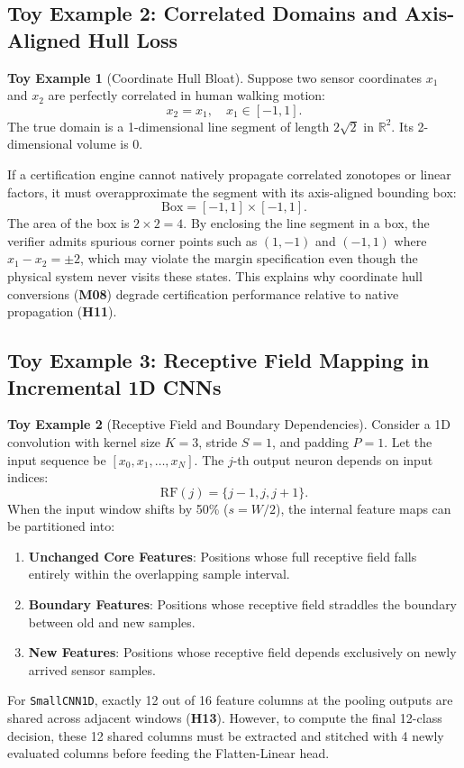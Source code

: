 \documentclass[11pt,article]{article}
\theoremstyle{definition}
\newtheorem{toyexample}{Toy Example}
\begin{document}
\subsection{Toy Example 2: Correlated Domains and Axis-Aligned Hull Loss}
\begin{toyexample}[Coordinate Hull Bloat]
Suppose two sensor coordinates $x_1$ and $x_2$ are perfectly correlated in human walking motion:
\begin{equation}
x_2 = x_1, \quad x_1 \in [-1, 1].
\end{equation}
The true domain is a 1-dimensional line segment of length $2\sqrt{2}$ in $\mathbb{R}^2$. Its 2-dimensional volume is 0.

If a certification engine cannot natively propagate correlated zonotopes or linear factors, it must overapproximate the segment with its axis-aligned bounding box:
\begin{equation}
\text{Box} = [-1, 1] \times [-1, 1].
\end{equation}
The area of the box is $2 \times 2 = 4$. By enclosing the line segment in a box, the verifier admits spurious corner points such as $(1, -1)$ and $(-1, 1)$ where $x_1 - x_2 = \pm 2$, which may violate the margin specification even though the physical system never visits these states. This explains why coordinate hull conversions (\textbf{M08}) degrade certification performance relative to native propagation (\textbf{H11}).
\end{toyexample}

\subsection{Toy Example 3: Receptive Field Mapping in Incremental 1D CNNs}
\begin{toyexample}[Receptive Field and Boundary Dependencies]
Consider a 1D convolution with kernel size $K=3$, stride $S=1$, and padding $P=1$.
Let the input sequence be $[x_0, x_1, \dots, x_N]$.
The $j$-th output neuron depends on input indices:
\begin{equation}
\text{RF}(j) = \{j-1, j, j+1\}.
\end{equation}
When the input window shifts by 50\% ($s = W/2$), the internal feature maps can be partitioned into:
\begin{enumerate}
    \item \textbf{Unchanged Core Features}: Positions whose full receptive field falls entirely within the overlapping sample interval.
    \item \textbf{Boundary Features}: Positions whose receptive field straddles the boundary between old and new samples.
    \item \textbf{New Features}: Positions whose receptive field depends exclusively on newly arrived sensor samples.
\end{enumerate}
For \texttt{SmallCNN1D}, exactly 12 out of 16 feature columns at the pooling outputs are shared across adjacent windows (\textbf{H13}). However, to compute the final 12-class decision, these 12 shared columns must be extracted and stitched with 4 newly evaluated columns before feeding the Flatten-Linear head.
\end{toyexample}
\end{document}
